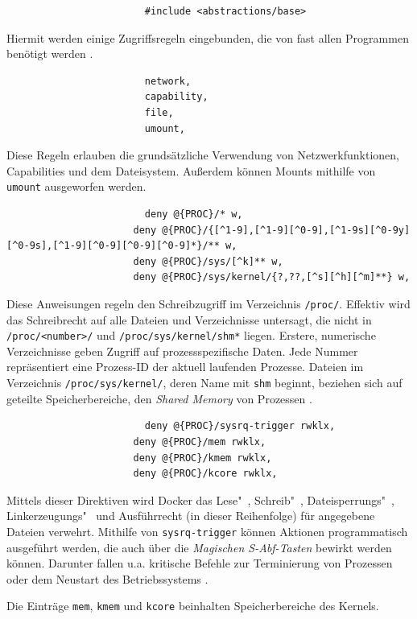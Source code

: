 \documentclass[../main.tex]{subfiles}
\begin{document}
					\begin{lstlisting}
						#include <abstractions/base>
					\end{lstlisting}
					Hiermit werden einige Zugriffsregeln eingebunden, die von fast allen Programmen benötigt werden \cite[S.100]{SELinuxApparmor}.

					\begin{lstlisting}
						network,
						capability,
						file,
						umount,
					\end{lstlisting}
					Diese Regeln erlauben die grundsätzliche Verwendung von Netzwerkfunktionen, Capabilities und dem Dateisystem. Außerdem können Mounts mithilfe von \texttt{umount} ausgeworfen werden.

					\begin{lstlisting}
						deny @{PROC}/* w,
					  deny @{PROC}/{[^1-9],[^1-9][^0-9],[^1-9s][^0-9y][^0-9s],[^1-9][^0-9][^0-9][^0-9]*}/** w,
					  deny @{PROC}/sys/[^k]** w,
					  deny @{PROC}/sys/kernel/{?,??,[^s][^h][^m]**} w,
					\end{lstlisting}
					Diese Anweisungen regeln den Schreibzugriff im Verzeichnis \texttt{/proc/}. Effektiv wird das Schreibrecht auf alle Dateien und Verzeichnisse untersagt, die nicht in \texttt{/proc/<number>/} und \texttt{/proc/sys/kernel/shm*} liegen. Erstere, numerische Verzeichnisse geben Zugriff auf prozessspezifische Daten. Jede Nummer repräsentiert eine Prozess-ID der aktuell laufenden Prozesse. Dateien im Verzeichnis \texttt{/proc/sys/kernel/}, deren Name mit \texttt{shm} beginnt, beziehen sich auf geteilte Speicherbereiche, den \emph{Shared Memory} von Prozessen \cite{apparmorShm}.

					\begin{lstlisting}
						deny @{PROC}/sysrq-trigger rwklx,
					  deny @{PROC}/mem rwklx,
					  deny @{PROC}/kmem rwklx,
					  deny @{PROC}/kcore rwklx,
					\end{lstlisting}
					Mittels dieser Direktiven wird Docker das Lese"~, Schreib"~, Dateisperrungs"~, Linkerzeugungs"~ und Ausführrecht (in dieser Reihenfolge) für angegebene Dateien verwehrt. Mithilfe von \texttt{sysrq-trigger} können Aktionen programmatisch ausgeführt werden, die auch über die \emph{Magischen S-Abf-Tasten} bewirkt werden können. Darunter fallen u.a. kritische Befehle zur Terminierung von Prozessen oder dem Neustart des Betriebssystems \cite{apparmorMagicSysRQ}\cite{apparmorSysrqTrigger}.

					Die Einträge \texttt{mem}, \texttt{kmem} und \texttt{kcore} beinhalten Speicherbereiche des Kernels.
\end{document}
